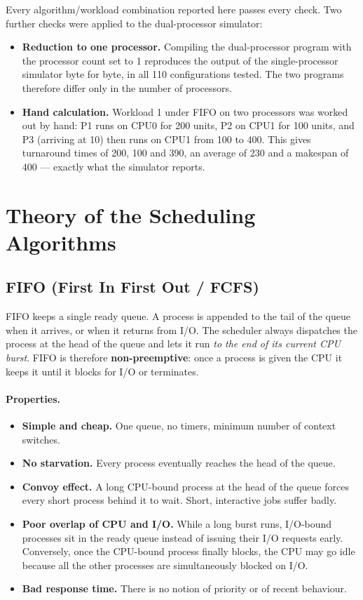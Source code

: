 \documentclass[11pt,a4paper]{article}
\begin{document}
Every algorithm/workload combination reported here passes every check. Two further checks
were applied to the dual-processor simulator:

\begin{itemize}\itemsep1pt
  \item \textbf{Reduction to one processor.} Compiling the dual-processor program with the
        processor count set to 1 reproduces the output of the single-processor simulator
        byte for byte, in all 110 configurations tested. The two programs therefore differ
        only in the number of processors.
  \item \textbf{Hand calculation.} Workload 1 under FIFO on two processors was worked out
        by hand: P1 runs on CPU0 for 200 units, P2 on CPU1 for 100 units, and P3 (arriving
        at 10) then runs on CPU1 from 100 to 400. This gives turnaround times of 200, 100
        and 390, an average of 230 and a makespan of 400 --- exactly what the simulator
        reports.
\end{itemize}

\section{Theory of the Scheduling Algorithms}

\subsection{FIFO (First In First Out / FCFS)}

FIFO keeps a single ready queue. A process is appended to the tail of the queue when it
arrives, or when it returns from I/O. The scheduler always dispatches the process at the
head of the queue and lets it run \emph{to the end of its current CPU burst}. FIFO is
therefore \textbf{non-preemptive}: once a process is given the CPU it keeps it until it
blocks for I/O or terminates.

\paragraph{Properties.}
\begin{itemize}\itemsep1pt
  \item \textbf{Simple and cheap.} One queue, no timers, minimum number of context switches.
  \item \textbf{No starvation.} Every process eventually reaches the head of the queue.
  \item \textbf{Convoy effect.} A long CPU-bound process at the head of the queue forces
        every short process behind it to wait. Short, interactive jobs suffer badly.
  \item \textbf{Poor overlap of CPU and I/O.} While a long burst runs, I/O-bound processes
        sit in the ready queue instead of issuing their I/O requests early. Conversely,
        once the CPU-bound process finally blocks, the CPU may go idle because all the
        other processes are simultaneously blocked on I/O.
  \item \textbf{Bad response time.} There is no notion of priority or of recent behaviour.
\end{itemize}
\end{document}
